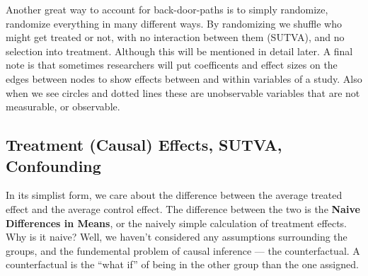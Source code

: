 \documentclass[12pt]{article}\usepackage[]{graphicx}\usepackage[]{color}
\begin{document}
\begin{flushleft}
Another great way to account for back-door-paths is to simply randomize, randomize everything in many different ways. By randomizing we shuffle who might get treated or not, with no interaction between them (SUTVA), and no selection into treatment. Although this will be mentioned in detail later. A final note is that sometimes researchers will put coefficents and effect sizes on the edges between nodes to show effects between and within variables of a study. Also when we see circles and dotted lines these are unobservable variables that are not measurable, or observable.


\begin{center}
\end{center}





\subsection{Treatment (Causal) Effects, SUTVA, Confounding}

In its simplist form, we care about the difference between the average treated effect and the average control effect. The difference between the two is the \textbf{Naive Differences in Means}, or the naively simple calculation of treatment effects. Why is it naive? Well, we haven't considered any assumptions surrounding the groups, and the fundemental problem of causal inference --- the counterfactual. A counterfactual is the ``what if'' of being in the other group than the one assigned. 


\end{flushleft}
\end{document}
